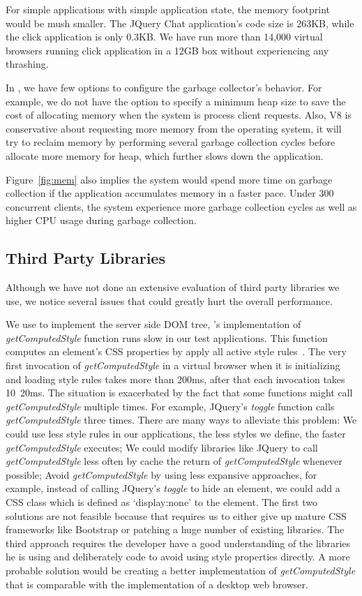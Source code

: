 For simple applications with simple application state, the memory footprint would be mush smaller.
The JQuery Chat application's code size is 263KB, while the click application is only 0.3KB.
We have run more than 14,000 virtual browsers running click application in a 12GB box without
experiencing any thrashing.

In \nodejs{}, we have few options to configure the garbage collector's behavior.
For example, we do not have the option to specify a minimum heap size to save
the cost of allocating memory when the system is process client requests.
Also, V8 is conservative about requesting more memory from the operating system, %
it will try to reclaim memory by performing several garbage collection cycles before 
allocate more memory for heap, %
which further slows down the application.

Figure~\ref{fig:mem} also implies the system would spend more time on garbage collection if
the application accumulates memory in a faster pace.
Under 300 concurrent clients, the system experience more garbage collection cycles as
well as higher CPU usage during garbage collection.

\subsection{Third Party Libraries}
Although we have not done an extensive evaluation of third party libraries we use,
we notice several issues that could greatly hurt the overall performance.

We use \jsdom{} to implement the server side DOM tree,
\jsdom{}'s implementation of \emph{getComputedStyle} function runs slow in our test applications.
This function computes an element's CSS properties by apply all active style rules~\cite{wilson2000document}.
The very first invocation of \emph{getComputedStyle} in a virtual browser when it
is initializing and loading style rules takes more than 200ms, 
after that each invocation takes 10~20ms.
The situation is exacerbated by the fact that some functions might call \emph{getComputedStyle}
multiple times.
For example, JQuery's \emph{toggle} function calls \emph{getComputedStyle} three times.
There are many ways to alleviate this problem:
We could use less style rules in our applications, the less styles we define,
the faster \emph{getComputedStyle} executes;
We could modify libraries like JQuery to call \emph{getComputedStyle} less often
by cache the return of \emph{getComputedStyle} whenever possible;
Avoid \emph{getComputedStyle} by using less expansive approaches, for example,
instead of calling JQuery's \emph{toggle} to hide an element, 
we could add a CSS class which is defined as `display:none' to the element.
The first two solutions are not feasible because that requires us to either give up
mature CSS frameworks like Bootstrap or patching a huge number of existing \js{} libraries.
The third approach requires the developer have a good understanding of the libraries
he is using and deliberately code to avoid using style properties directly.
A more probable solution would be creating a better implementation of \emph{getComputedStyle} 
that is comparable with the implementation of a desktop web browser.

